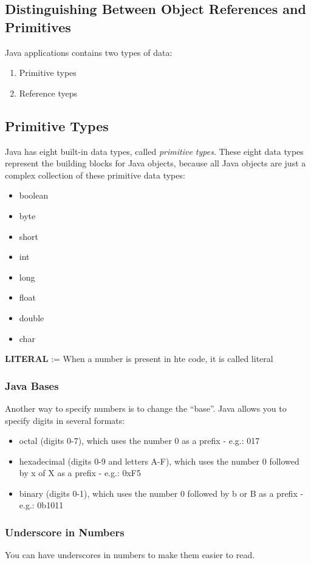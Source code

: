\documentclass{article}
\begin{document}
\subsection{Distinguishing Between Object References and Primitives}
Java applications contains two types of data:
\begin{enumerate}
	\item Primitive types
	\item Reference tyeps
\end{enumerate}

\subsection{Primitive Types}
Java has eight built-in data types, called \textit{primitive types}. These eight data types represent the building blocks for Java objects, because all Java objects are just a complex collection of these primitive data types:
\begin{itemize}
	\item boolean
	\item byte
	\item short
	\item int
	\item long
	\item float
	\item double
	\item char
\end{itemize}

\textbf{LITERAL} := When a number is present in hte code, it is called literal

\subsubsection{Java Bases}
Another way to specify numbers is to change the ``base''. Java allows you to specify digits in several formats:
\begin{itemize}
	\item octal (digits 0-7), which uses the number 0 as a prefix - e.g.: 017
	\item hexadecimal (digits 0-9 and letters A-F), which uses the number 0 followed by x of X as a prefix - e.g.: 0xF5
	\item binary (digits 0-1), which uses the number 0 followed by b or B as a prefix - e.g.: 0b1011
\end{itemize}

\subsubsection{Underscore in Numbers}
You can have underscores in numbers to make them easier to read.
\end{document}
